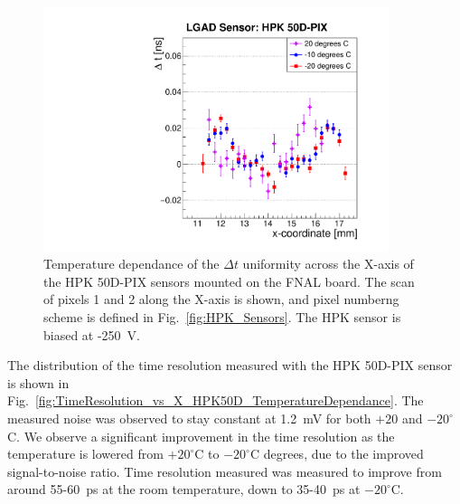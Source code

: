 \documentclass[preprint,1p]{elsarticle}
\begin{document}
\begin{figure}[htbp] 
\centering
\includegraphics[width=0.9\textwidth]{figs/FNAL_MeanTime_vs_X_HPK50D_TemperatureDependance.pdf} 
\caption{Temperature dependance of the $\Delta t$ uniformity across
the X-axis of the HPK 50D-PIX sensors mounted on the FNAL board. The scan of
pixels 1 and 2 along the X-axis is shown, and pixel numberng scheme is defined
in Fig.~\ref{fig:HPK_Sensors}. The HPK sensor is biased at -250~V.} 
\label{fig:MeanTime_vs_X_HPK50D_TemperatureDependance} 
\end{figure} 

The distribution of the time resolution measured with the HPK 50D-PIX sensor is
shown in Fig.~\ref{fig:TimeResolution_vs_X_HPK50D_TemperatureDependance}. The
measured noise was observed to stay constant at 1.2~mV for both $+20$ and
$-20^{\circ}$C. We observe a significant improvement in the time resolution as
the temperature is lowered from $+20^{\circ}$C to $-20^{\circ}$C degrees, due to
the improved signal-to-noise ratio. Time resolution measured was measured to
improve from around 55-60~ps at the room temperature, down to 35-40~ps at
$-20^{\circ}$C.
\end{document}
